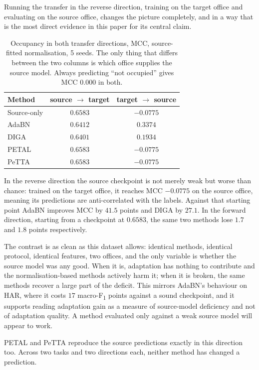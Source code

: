\documentclass[a4paper,fleqn]{cas-dc}
\newcommand{\macf}{macro-F\textsubscript{1}}
\begin{document}
Running the transfer in the reverse direction, training on the target office and
evaluating on the source office, changes the picture completely, and in a way that is
the most direct evidence in this paper for its central claim.

\begin{table}[t]
\centering
\caption{Occupancy in both transfer directions, MCC, source-fitted normalisation, 5 seeds.
The only thing that differs between the two columns is which office supplies the source
model. Always predicting ``not occupied'' gives MCC $0.000$ in both.}
\label{tab:oe-rev}
\small
\begin{tabular}{lcc}
\toprule
Method & source $\to$ target & target $\to$ source \\
\midrule
Source-only & $\mathbf{0.6583}$ & $-0.0775$ \\
AdaBN       & $0.6412$ & $\mathbf{0.3374}$ \\
DIGA        & $0.6401$ & $0.1934$ \\
PETAL       & $0.6583$ & $-0.0775$ \\
PeTTA       & $0.6583$ & $-0.0775$ \\
\bottomrule
\end{tabular}
\end{table}

In the reverse direction the source checkpoint is not merely weak but worse than chance:
trained on the target office, it reaches MCC $-0.0775$ on the source office, meaning its
predictions are anti-correlated with the labels. Against that starting point AdaBN
improves MCC by $41.5$ points and DIGA by $27.1$. In the forward direction, starting from
a checkpoint at $0.6583$, the same two methods lose $1.7$ and $1.8$ points respectively.

The contrast is as clean as this dataset allows: identical methods, identical protocol,
identical features, two offices, and the only variable is whether the source model was any
good. When it is, adaptation has nothing to contribute and the normalisation-based methods
actively harm it; when it is broken, the same methods recover a large part of the deficit.
This mirrors AdaBN's behaviour on HAR, where it costs $17$ \macf{} points against a sound
checkpoint, and it supports reading adaptation gain as a measure of source-model
deficiency and not of adaptation quality. A method evaluated only against a weak
source model will appear to work.

PETAL and PeTTA reproduce the source predictions exactly in this direction too. Across two
tasks and two directions each, neither method has changed a prediction.
\end{document}

